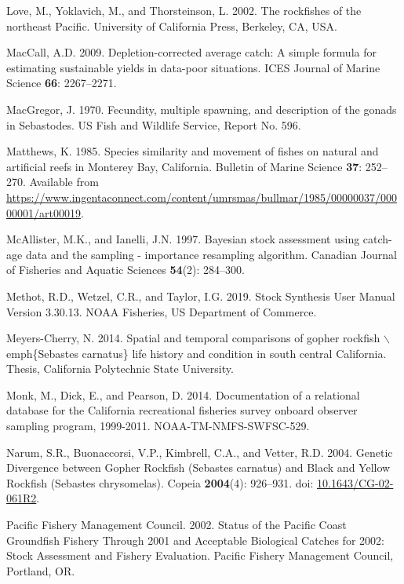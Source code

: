 \documentclass[12pt,]{article}
\begin{document}
\hypertarget{ref-Love2002}{}
Love, M., Yoklavich, M., and Thorsteinson, L. 2002. The rockfishes of
the northeast Pacific. University of California Press, Berkeley, CA,
USA.

\hypertarget{ref-MacCall2009}{}
MacCall, A.D. 2009. Depletion-corrected average catch: A simple formula
for estimating sustainable yields in data-poor situations. ICES Journal
of Marine Science \textbf{66}: 2267--2271.

\hypertarget{ref-MacGregor1970}{}
MacGregor, J. 1970. Fecundity, multiple spawning, and description of the
gonads in Sebastodes. US Fish and Wildlife Service, Report No. 596.

\hypertarget{ref-Matthews1985}{}
Matthews, K. 1985. Species similarity and movement of fishes on natural
and artificial reefs in Monterey Bay, California. Bulletin of Marine
Science \textbf{37}: 252--270. Available from
\url{https://www.ingentaconnect.com/content/umrsmas/bullmar/1985/00000037/00000001/art00019}.

\hypertarget{ref-McAllister1997}{}
McAllister, M.K., and Ianelli, J.N. 1997. Bayesian stock assessment
using catch-age data and the sampling - importance resampling algorithm.
Canadian Journal of Fisheries and Aquatic Sciences \textbf{54}(2):
284--300.

\hypertarget{ref-Methot2019}{}
Methot, R.D., Wetzel, C.R., and Taylor, I.G. 2019. Stock Synthesis User
Manual Version 3.30.13. NOAA Fisheries, US Department of Commerce.

\hypertarget{ref-MeyersCherry2014}{}
Meyers-Cherry, N. 2014. Spatial and temporal comparisons of gopher
rockfish \(\backslash\)emph\{Sebastes carnatus\} life history and
condition in south central California. Thesis, California Polytechnic
State University.

\hypertarget{ref-Monk2014}{}
Monk, M., Dick, E., and Pearson, D. 2014. Documentation of a relational
database for the California recreational fisheries survey onboard
observer sampling program, 1999-2011. NOAA-TM-NMFS-SWFSC-529.

\hypertarget{ref-Narum2004}{}
Narum, S.R., Buonaccorsi, V.P., Kimbrell, C.A., and Vetter, R.D. 2004.
Genetic Divergence between Gopher Rockfish (Sebastes carnatus) and Black
and Yellow Rockfish (Sebastes chrysomelas). Copeia \textbf{2004}(4):
926--931. doi:
\href{https://doi.org/10.1643/CG-02-061R2}{10.1643/CG-02-061R2}.

\hypertarget{ref-PFMC2002}{}
Pacific Fishery Management Council. 2002. Status of the Pacific Coast
Groundfish Fishery Through 2001 and Acceptable Biological Catches for
2002: Stock Assessment and Fishery Evaluation. Pacific Fishery
Management Council, Portland, OR.
\end{document}
